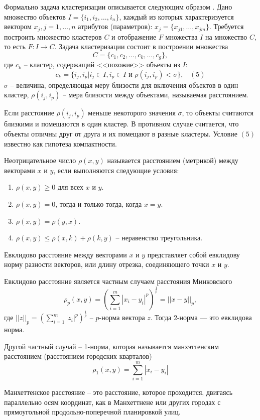 \documentclass[bachelor, och, referat]{SCWorks}
\begin{document}
Формально задача кластеризации описывается следующим образом \cite{cluster}.
Дано множество объектов $I = \{ i_1, i_2, \dots, i_n \}$, 
каждый из которых характеризуется вектором $x_j, j = 1, \dots, n$
атрибутов (параметров): $x_j = \{ x_{j1}, \dots, x_{jm} \}$.
Требуется построить множество кластеров $C$ и отображение $F$
множества $I$ на множество $C$, то есть $F: I \rightarrow C$.
Задача кластеризации состоит в построении множества
\[ C = \{ c_1, c_2, \dots, c_k, \dots, c_g \}, \]
где $c_k$ -- кластер, содержащий <<похожие>> объекты из $I$:
\[ c_k = \{ i_j, i_p | i_j \in I, i_p \in I \text{ и } \rho(i_j, i_p) < \sigma \}, \; \; \; (5) \]
$\sigma$ -- величина, определяющая меру близости для включения объектов
в один кластер, $\rho(i_j, i_p)$ -- мера близости между объектами,
называемая расстоянием.

Если расстояние $\rho(i_j, i_p)$ меньше некоторого значения $\sigma$,
то объекты считаются близкими и помещаются в один кластер.
В противном случае считается, что объекты отличны друг от друга и их помещают в разные
кластеры. Условие $(5)$ известно как гипотеза компактности. 

Неотрицательное число $\rho(x, y)$ называется расстоянием (метрикой)
между векторами $x$ и $y$, если выполняются следующие условия: 
\begin{enumerate}
    \item $\rho(x, y) \geq 0$ для всех $x$ и $y$.
    \item $\rho(x, y) = 0$, тогда и только тогда, когда $x = y$.
    \item $\rho(x, y) = \rho(y, x)$.
    \item $\rho(x, y) \leq \rho(x, k) + \rho(k, y)$ -- неравенство треугольника.
\end{enumerate}

Евклидово расстояние между векторами $x$ и $y$ представляет собой 
евклидову норму разности векторов, или длину отрезка, соединяющего точки
$x$ и $y$. 

Евклидово расстояние является частным случаем расстояния
Минковского
\[ \rho_p(x, y) = (\sum_{i = 1}^{m}|x_i - y_i|^p)^{\frac{1}{p}} = ||x - y||_p, \]
где $||z||_p = \displaystyle(\sum_{i = 1}^{m}|z_i|^p)^{\frac{1}{p}}$ -- $p$-норма вектора $z$.
Тогда 2-норма — это евклидова норма. 

Другой частный случай -- 1-норма, которая называется манхэттенским
расстоянием (расстоянием городских кварталов)
\[ \rho_1(x, y) = \sum_{i = 1}^{m} |x_i - y_i| \]

Манхеттенское расстояние -- это расстояние, которое проходится,
двигаясь параллельно осям координат, как в Манхеттнене или других
городах с прямоугольной продольно-поперечной планировкой улиц. 
\end{document}
